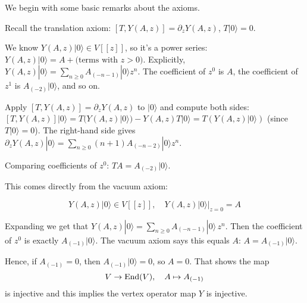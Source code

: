 \documentclass[12pt]{article}
\begin{document}
We begin with some basic remarks about the axioms.
\begin{remark}
    [$T$ is determined by $Y$] Recall the translation axiom:
    $[T, Y(A,z)] = \partial_z Y(A,z)$, $T|0\rangle = 0$.

    We know $Y(A,z)|0\rangle \in V[[z]]$, so it's a power series:
    $Y(A,z)|0\rangle = A + \text{(terms with } z>0)$.
    Explicitly,
    $Y(A,z)|0\rangle = \sum_{n\ge 0} A_{(-n-1)}|0\rangle z^n$.
    The coefficient of $z^0$ is $A$, the coefficient of $z^1$ is $A_{(-2)}|0\rangle$, and so on.

Apply $[T,Y(A,z)] = \partial_z Y(A,z)$ to $|0\rangle$ and compute both sides:
    $[T, Y(A,z)]|0\rangle = T(Y(A,z)|0\rangle) - Y(A,z)T|0\rangle = T(Y(A,z)|0\rangle)$
    (since $T|0\rangle=0$).
    The right-hand side gives
    $\partial_z Y(A,z)|0\rangle = \sum_{n\ge 0} (n+1)A_{(-n-2)}|0\rangle z^n$.

    Comparing coefficients of $z^0$:
    $T A = A_{(-2)}|0\rangle$.
\end{remark}

\begin{remark}[$Y$ is injective]
    This comes directly from the vacuum axiom:

\[Y(A,z)|0\rangle \in V[[z]], \quad Y(A,z)|0\rangle\big|_{z=0} = A\]

Expanding we get that $Y(A,z)|0\rangle = \sum_{n\ge 0} A_{(-n-1)}|0\rangle\,z^n$.
Then the coefficient of $z^0$ is exactly $A_{(-1)}|0\rangle$.
The vacuum axiom says this equals $A$:
$A = A_{(-1)}|0\rangle$.

Hence, if $A_{(-1)} = 0$, then $A_{(-1)}|0\rangle = 0$, so $A=0$.
That shows the map
\[
V \to \operatorname{End}(V), \quad A \mapsto A_{(-1)}
\]
is injective and this implies the vertex operator map $Y$ is injective.
\end{remark}
\end{document}
